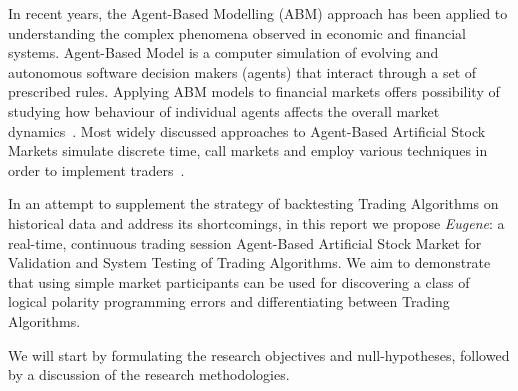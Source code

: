 In recent years, the Agent-Based Modelling (ABM) approach has been applied to understanding the complex phenomena observed in economic and financial systems. Agent-Based Model is a computer simulation of evolving and autonomous software decision makers (agents) that interact through a set of prescribed rules. Applying ABM models to financial markets offers possibility of studying how behaviour of individual agents affects the overall market dynamics~\citep{Sorban2008, Farmer2009}. Most widely discussed approaches to Agent-Based Artificial Stock Markets simulate discrete time, call markets and employ various techniques in order to implement traders~\cite{Jha2010}.

In an attempt to supplement the strategy of backtesting Trading Algorithms on historical data and address its shortcomings, in this report we propose \emph{Eugene}: a real-time, continuous trading session Agent-Based Artificial Stock Market for Validation and System Testing of Trading Algorithms. We aim to demonstrate that using simple market participants can be used for discovering a class of logical polarity programming errors and differentiating between Trading Algorithms.

We will start by formulating the research objectives and null-hypotheses, followed by a discussion of the research methodologies.




